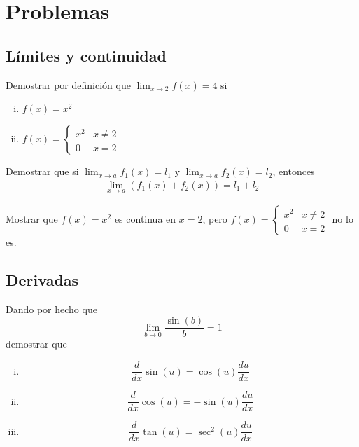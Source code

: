 \section{Problemas}

\subsection{Límites y continuidad}

\begin{problema}
	Demostrar por definición que $\lim_{x\to 2}f(x)=4$ si
	\begin{enumerate}[(i)]
		\item $f(x)=x^{2}$

		\item $f(x)= \begin{cases}
			x^{2} & x\neq 2 \\
			0 & x =2
		\end{cases}$
	\end{enumerate}
\end{problema}


\begin{problema}
	Demostrar que si $\lim_{x\to a}f_{1}(x)=l_{1}$ y $\lim_{x\to a}f_{2}(x)=l_{2}$, entonces
	\begin{align*}
		\lim_{x\to a}\left( f_{1}(x)+f_{2}(x) \right)=l_{1}+l_{2}
	\end{align*}
\end{problema}

\begin{problema}
	Mostrar que $f(x)=x^{2}$ es continua en $x=2$, pero $f(x)= \begin{cases}
		x^{2} & x\neq 2 \\
		0 & x =2
	\end{cases}$ no lo es.
\end{problema}

\subsection{Derivadas}

\begin{problema}
	Dando por hecho que \[\lim_{b\to 0}\dfrac{\sin(b)}{b}=1\] demostrar que
	\begin{enumerate}[(i)]
		\item \[\dfrac{d}{dx}\sin(u)=\cos(u)\dfrac{du}{dx}\]
		\item \[\dfrac{d}{dx}\cos(u)=-\sin(u)\dfrac{du}{dx}\]
		\item \[\dfrac{d}{dx}\tan(u)=\sec^{2}(u)\dfrac{du}{dx}\]

	\end{enumerate}
\end{problema}


